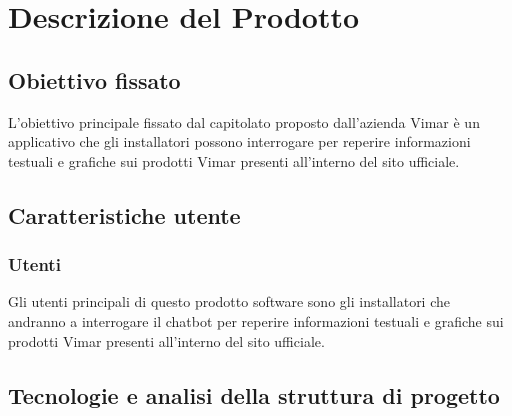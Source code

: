 \section{Descrizione del Prodotto}
\subsection{Obiettivo fissato}
L'obiettivo principale fissato dal capitolato proposto dall'azienda Vimar è un applicativo che gli installatori possono
interrogare per reperire informazioni testuali e grafiche sui prodotti Vimar presenti all’interno del
sito ufficiale.
\subsection{Caratteristiche utente}
\subsubsection{Utenti}
Gli utenti principali di questo prodotto software sono gli installatori che andranno a interrogare il chatbot per reperire informazioni testuali e grafiche sui prodotti Vimar presenti all'interno del sito ufficiale.
\subsection{Tecnologie  e analisi della struttura di progetto} 
